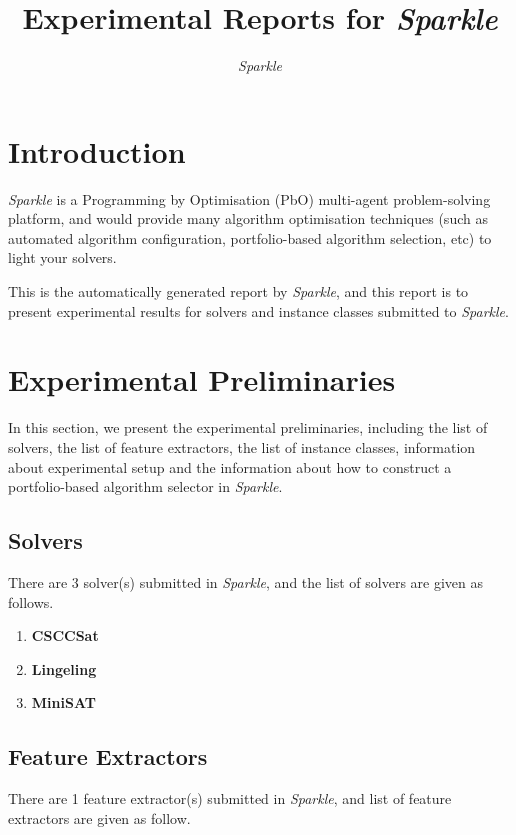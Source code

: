 \documentclass[british]{article}
\title{Experimental Reports for \emph{Sparkle} }
\author{ \emph{Sparkle} }
\begin{document}
\maketitle %


\section{Introduction}
\label{sec:Introduction}

\emph{Sparkle} \cite{Hoos15} is a Programming by Optimisation (PbO) \cite{Hoos12} multi-agent problem-solving platform, and would provide many algorithm optimisation techniques (such as automated algorithm configuration, portfolio-based algorithm selection, etc) to light your solvers. 

This is the automatically generated report by \emph{Sparkle}, and this report is to present experimental results for solvers and instance classes submitted to \emph{Sparkle}.


\section{Experimental Preliminaries}
\label{sec:Experimental_Preliminaries}

In this section, we present the experimental preliminaries, including the list of solvers, the list of feature extractors, the list of instance classes, information about experimental setup and the information about how to construct a portfolio-based algorithm selector in \emph{Sparkle}.

\subsection{Solvers}
\label{sec:Solvers}
There are 3 solver(s) submitted in \emph{Sparkle}, and the list of solvers are given as follows.


\begin{enumerate} 
\item \textbf{CSCCSat}
\item \textbf{Lingeling}
\item \textbf{MiniSAT}

\end{enumerate}


\subsection{Feature Extractors}
\label{sec:Feature_Extractors}
There are 1 feature extractor(s) submitted in \emph{Sparkle}, and list of feature extractors are given as follow.
\end{document}
